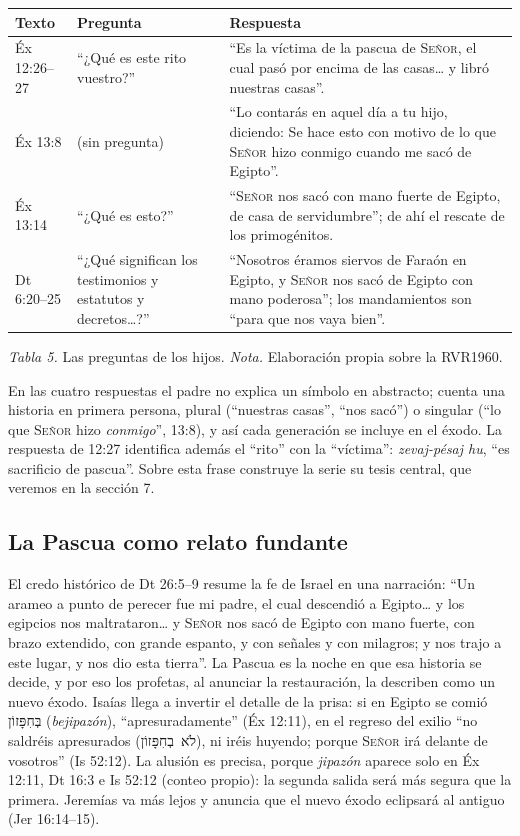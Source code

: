 \documentclass[11pt,letterpaper]{article}
\newcommand{\heb}[1]{\mbox{\foreignlanguage{hebrew}{#1}}}
\newcommand{\SENOR}{\textsc{Señor}}
\begin{document}
\begin{table}[!htbp]\centering\small\renewcommand{\arraystretch}{1.2}
\begin{tabular}{@{}L{2.0cm}L{5.0cm}L{7.4cm}@{}}
\toprule
\textbf{Texto} & \textbf{Pregunta} & \textbf{Respuesta} \\ \midrule
Éx 12:26--27 & ``¿Qué es este rito vuestro?'' & ``Es la víctima de la pascua de \SENOR, el cual pasó por encima de las casas\ldots{} y libró nuestras casas''. \\
Éx 13:8 & (sin pregunta) & ``Lo contarás en aquel día a tu hijo, diciendo: Se hace esto con motivo de lo que \SENOR{} hizo conmigo cuando me sacó de Egipto''. \\
Éx 13:14 & ``¿Qué es esto?'' & ``\SENOR{} nos sacó con mano fuerte de Egipto, de casa de servidumbre''; de ahí el rescate de los primogénitos. \\
Dt 6:20--25 & ``¿Qué significan los testimonios y estatutos y decretos\ldots?'' & ``Nosotros éramos siervos de Faraón en Egipto, y \SENOR{} nos sacó de Egipto con mano poderosa''; los mandamientos son ``para que nos vaya bien''. \\
\bottomrule
\end{tabular}\par
{\footnotesize\color{sepia}\textit{Tabla 5.} Las preguntas de los hijos. \textit{Nota.} Elaboración propia sobre la RVR1960.}
\end{table}

En las cuatro respuestas el padre no explica un símbolo en abstracto; cuenta una historia en primera persona, plural (``nuestras casas'', ``nos sacó'') o singular (``lo que \SENOR{} hizo \emph{conmigo}'', 13:8), y así cada generación se incluye en el éxodo. La respuesta de 12:27 identifica además el ``rito'' con la ``víctima'': \emph{zevaj-pésaj hu}, ``es sacrificio de pascua''. Sobre esta frase construye la serie su tesis central, que veremos en la sección 7.

\subsection{La Pascua como relato fundante}
El credo histórico de Dt 26:5--9 resume la fe de Israel en una narración: ``Un arameo a punto de perecer fue mi padre, el cual descendió a Egipto\ldots{} y los egipcios nos maltrataron\ldots{} y \SENOR{} nos sacó de Egipto con mano fuerte, con brazo extendido, con grande espanto, y con señales y con milagros; y nos trajo a este lugar, y nos dio esta tierra''. La Pascua es la noche en que esa historia se decide, y por eso los profetas, al anunciar la restauración, la describen como un nuevo éxodo. Isaías llega a invertir el detalle de la prisa: si en Egipto se comió \heb{בְּחִפָּזוֹן} (\emph{bejipazón}), ``apresuradamente'' (Éx 12:11), en el regreso del exilio ``no saldréis apresurados (\heb{לֹא בְחִפָּזוֹן}), ni iréis huyendo; porque \SENOR{} irá delante de vosotros'' (Is 52:12). La alusión es precisa, porque \emph{jipazón} aparece solo en Éx 12:11, Dt 16:3 e Is 52:12 (conteo propio): la segunda salida será más segura que la primera. Jeremías va más lejos y anuncia que el nuevo éxodo eclipsará al antiguo (Jer 16:14--15).
\end{document}
